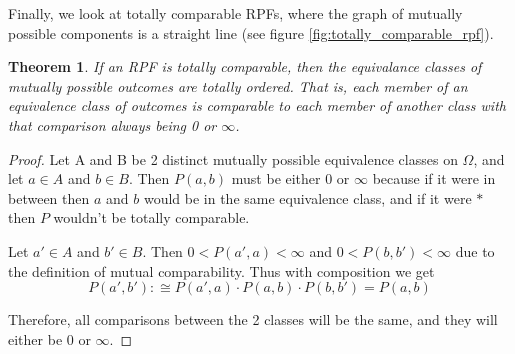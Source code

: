 \documentclass[twoside]{article}
\theoremstyle{plain}%
\newtheorem{theorem}{Theorem}[section]
\theoremstyle{definition}
\theoremstyle{remark}
\begin{document}
Finally, we look at totally comparable RPFs, where the graph of mutually possible components is a straight line (see figure \ref{fig:totally_comparable_rpf}).

\begin{theorem}
If an RPF is totally comparable, then the equivalance classes of mutually possible outcomes are \textit{totally ordered}. That is, each member of an equivalence class of outcomes is comparable to each member of another class with that comparison always being 0 or \(\infty\).
\end{theorem}

\begin{proof}
Let A and B be 2 distinct mutually possible equivalence classes on \(\Omega\), and let \(a \in A\) and \(b \in B\). Then \(P(a, b)\) must be either 0 or \(\infty\) because if it were in between then \(a\) and \(b\) would be in the same equivalence class, and if it were \(\ast\) then \(P\) wouldn't be totally comparable.

Let \(a' \in A\) and \(b' \in B\). Then \(0 < P(a', a) < \infty\) and \(0 < P(b, b') < \infty\) due to the definition of mutual comparability. Thus with composition we get
\[P(a', b') :\cong P(a', a) \cdot P(a, b) \cdot P(b, b') = P(a, b)\]

Therefore, all comparisons between the 2 classes will be the same, and they will either be 0 or \(\infty\).
\end{proof}
\end{document}
